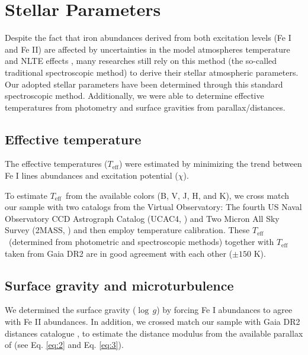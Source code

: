 \chapter{Stellar Parameters}\label{chap:introduction}

Despite the fact that iron abundances derived from both excitation levels (Fe I 
and Fe II) are affected by uncertainties in the model atmospheres temperature and
NLTE effects \citep[see][and reference therein]{2017A&A...604A.129M}, many researches still rely on this method (the so-called traditional 
spectroscopic method) to derive their stellar atmospheric parameters. 
Our adopted stellar parameters have been determined through this standard spectroscopic method. 
Additionally, we were able to determine effective temperatures from photometry and surface gravities from parallax/distances.

\section{Effective temperature}
The effective temperatures (\ensuremath{T_\mathrm{eff}}) were estimated by 
minimizing the trend between Fe I lines abundances and excitation potential ($\chi$). 

To estimate \ensuremath{T_\mathrm{eff}}~from the available colors (B, V, J, H, and K), we cross match our sample with two catalogs 
from the Virtual Observatory:  The fourth US Naval 
Observatory CCD Astrograph Catalog (UCAC4, \citealt{2013AJ....145...44Z} )
and Two Micron All Sky Survey (2MASS, \citealt{2006AJ....131.1163S}) and then
employ \citet{2005ApJ...626..465R} temperature calibration.
These \ensuremath{T_\mathrm{eff}}~(determined from photometric and spectroscopic methods) together with \ensuremath{T_\mathrm{eff}}~
taken from Gaia DR2 \citep{2018A&A...616A...1G} are in good agreement with each other ($\pm 150$ K).

\section{Surface gravity and microturbulence}
We determined the surface gravity (\ensuremath{\log\,g}) by forcing Fe I abundances to 
agree with Fe II abundances. In addition, we crossed match our sample with Gaia DR2 distances catalogue \citep{2018AJ....156...58B}, to estimate 
the distance modulus from the available parallax of \citet{2018A&A...616A...1G} (see Eq. \ref{eq:2} and Eq. \ref{eq:3}).



